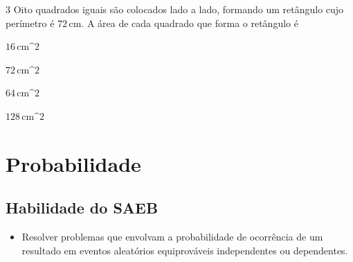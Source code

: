 {{{{\begin{escolha}
{\num{3}  Oito quadrados iguais são colocados lado a lado, formando um
retângulo cujo perímetro é $72\,\text{cm}$. A área de cada quadrado que forma o
retângulo é

\begin{multicols}{2}
\begin{escolha}
\item $16\,\text{cm^2}$
\item $72\,\text{cm^2}$
\item $64\,\text{cm^2}$
\item $128\,\text{cm^2}$
\end{escolha}
\end{multicols}



\chapter{ Probabilidade}

\section*{Habilidade do SAEB}
\begin{itemize}
\item Resolver problemas que envolvam a probabilidade de
ocorrência de um resultado em eventos aleatórios equiprováveis
independentes ou dependentes.
\end{itemize}

}
\end{escolha}}}}}
